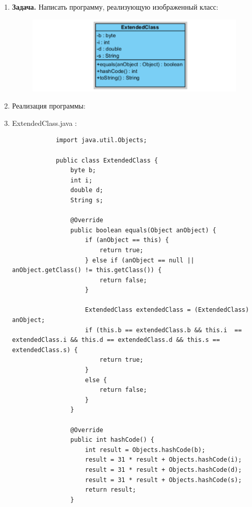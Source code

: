 \documentclass[a4paper]{article}
\begin{document}
    \begin{enumerate}
   
        \item \textbf{Задача.} Написать программу, реализующую изображенный класс:
        
        \begin{figure}[h!]
            \begin{center}
                \includegraphics[scale = 0.8]{task.png}
                \label{p2} %
            \end{center}
        \end{figure}

        \item Реализация программы:
        \item ExtendedClass.java :
        
        \begin{lstlisting}
            import java.util.Objects;

            public class ExtendedClass {
                byte b;
                int i;
                double d;
                String s;

                @Override
                public boolean equals(Object anObject) {
                    if (anObject == this) {
                        return true;
                    } else if (anObject == null || anObject.getClass() != this.getClass()) {
                        return false;
                    }

                    ExtendedClass extendedClass = (ExtendedClass) anObject;
                    if (this.b == extendedClass.b && this.i  == extendedClass.i && this.d == extendedClass.d && this.s == extendedClass.s) {
                        return true;
                    } 
                    else {
                        return false;
                    }    
                }

                @Override
                public int hashCode() {
                    int result = Objects.hashCode(b);
                    result = 31 * result + Objects.hashCode(i);
                    result = 31 * result + Objects.hashCode(d);
                    result = 31 * result + Objects.hashCode(s);
                    return result;
                }


\end{lstlisting}
\end{enumerate}
\end{document}
